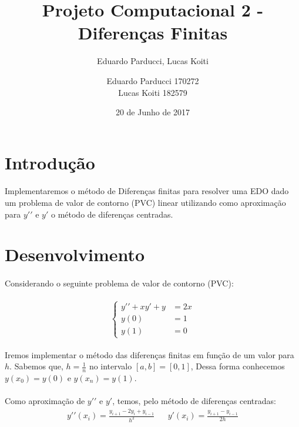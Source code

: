 \documentclass{coursepaper}
\author{Eduardo Parducci, Lucas Koiti}
\title{Projeto Computacional 2 - Diferenças Finitas}
\author{Eduardo Parducci 170272\\Lucas Koiti 182579}
\date{20 de Junho de 2017}
\begin{document}
    \maketitle

    \section{Introdução}
        \paragraph{}
            Implementaremos o método de Diferenças finitas para resolver uma EDO dado um problema de valor de contorno (PVC) linear utilizando como aproximação para $y\prime\prime$ e $y\prime$ o método de diferenças centradas.
    \newpage
    \section{Desenvolvimento}
        \paragraph{}
            Considerando o seguinte problema de valor de contorno (PVC):\\ \\
            \begin{equation}
                \begin{cases}
                    y\prime\prime+xy\prime+y &= 2x\\
                    y(0) &= 1\\
                    y(1) &= 0
                \end{cases}
            \end{equation}
        \paragraph{}
            Iremos implementar o método das diferenças finitas em função de um valor para $h$. Sabemos que, $h = \frac{1}{n}$ no intervalo $[a,b] = [0,1]$, Dessa forma conhecemos $y(x_{0}) = y(0)$ e $y(x_{n}) = y(1)$.
        \paragraph{}
            Como aproximação de $y\prime\prime$ e $y\prime$, temos, pelo método de diferenças centradas:
            \begin{align}
                y\prime\prime(x_{i}) = \frac{y_{i+1} - 2y_{i} + y_{i-1}}{h^2} &&
                y\prime(x_{i}) = \frac{y_{i+1} - y_{i-1}}{2h}
            \end{align}
\end{document}
